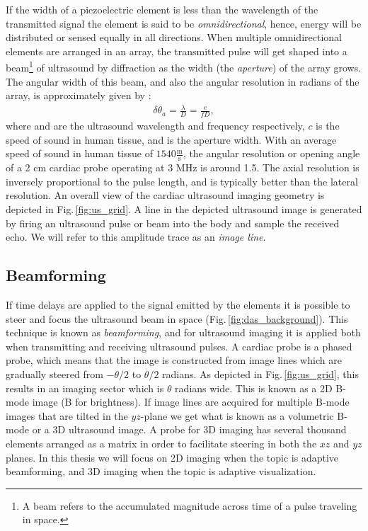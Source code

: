 If the width of a piezoelectric element is less than the wavelength of the transmitted signal the element is said to be \textit{omnidirectional}, hence, energy will be distributed or sensed equally in all directions. When multiple omnidirectional elements are arranged in an array, the transmitted pulse will get shaped into a beam\footnote{A beam refers to the accumulated magnitude across time of a pulse traveling in space.} of ultrasound by diffraction as the width (the \textit{aperture}) of the array grows. The angular width of this beam, and also the angular resolution in radians of the array, is approximately given by \cite{AngelUltrasound}:
\begin{align}\label{eq:res}
\delta\theta_a = \frac{\lambda}{D} = \frac{c}{fD},
\end{align}
where  and  are the ultrasound wavelength and frequency respectively, $c$ is the speed of sound in human tissue, and  is the aperture width. With an average speed of sound in human tissue of $1540\frac{\text{m}}{\text{s}}$, the angular resolution or opening angle of a 2 cm cardiac probe operating at 3 MHz is around 1.5\degree. The axial resolution is inversely proportional to the pulse length, and is typically better than the lateral resolution. An overall view of the cardiac ultrasound imaging geometry is depicted in Fig.\,\ref{fig:us_grid}. A line in the depicted ultrasound image is generated by firing an ultrasound pulse or beam into the body and sample the received echo. We will refer to this amplitude trace as an \textit{image line}. 

\subsection{Beamforming}
If time delays are applied to the signal emitted by the elements it is possible to steer and focus the ultrasound beam in space (Fig.\,\ref{fig:das_background}). This technique is known as \textit{beamforming}, and for ultrasound imaging it is applied both when transmitting and receiving ultrasound pulses. A cardiac probe is a phased probe, which means that the image is constructed from image lines which are gradually steered from $-\theta/2$ to $\theta/2$ radians. As depicted in Fig.\,\ref{fig:us_grid}, this results in an imaging sector which is $\theta$ radians wide. This is known as a 2D B-mode image (B for brightness). If image lines are acquired for multiple B-mode images that are tilted in the $yz$-plane we get what is known as a volumetric B-mode or a 3D ultrasound image. A probe for 3D imaging has several thousand elements arranged as a matrix in order to facilitate steering in both the $xz$ and $yz$ planes. In this thesis we will focus on 2D imaging when the topic is adaptive beamforming, and 3D imaging when the topic is adaptive visualization.

